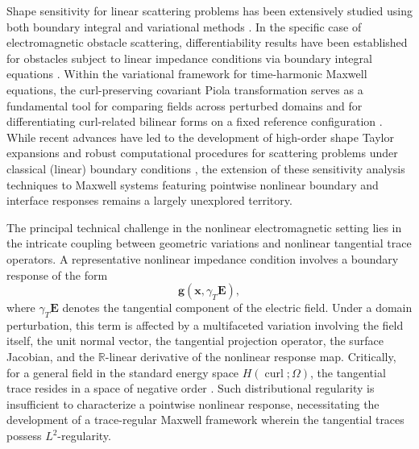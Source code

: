 \documentclass[12pt,reqno]{amsart}
\theoremstyle{definition}
\numberwithin{equation}{section}
\begin{document}
Shape sensitivity for linear scattering problems has been extensively studied using both boundary integral and variational methods \cite{Hettlich1995, Kirsch1989, Kress2018}. In the specific case of electromagnetic obstacle scattering, differentiability results have been established for obstacles subject to linear impedance conditions via boundary integral equations \cite{HaddarKress2004}. Within the variational framework for time-harmonic Maxwell equations, the curl-preserving covariant Piola transformation serves as a fundamental tool for comparing fields across perturbed domains and for differentiating curl-related bilinear forms on a fixed reference configuration \cite{Hettlich2012}. While recent advances have led to the development of high-order shape Taylor expansions and robust computational procedures for scattering problems under classical (linear) boundary conditions \cite{bao2025computation, bao2026shape}, the extension of these sensitivity analysis techniques to Maxwell systems featuring pointwise nonlinear boundary and interface responses remains a largely unexplored territory.

The principal technical challenge in the nonlinear electromagnetic setting lies in the intricate coupling between geometric variations and nonlinear tangential trace operators. A representative nonlinear impedance condition involves a boundary response of the form
\begin{equation*}
    \mathbf{g}(\mathbf{x}, \gamma_T \mathbf{E}),
\end{equation*}
where $\gamma_T \mathbf{E}$ denotes the tangential component of the electric field. Under a domain perturbation, this term is affected by a multifaceted variation involving the field itself, the unit normal vector, the tangential projection operator, the surface Jacobian, and the $\mathbb{R}$-linear derivative of the nonlinear response map. Critically, for a general field in the standard energy space $H(\operatorname{curl}; \Omega)$, the tangential trace resides in a space of negative order \cite{BuffaCostabelSheen2002}. Such distributional regularity is insufficient to characterize a pointwise nonlinear response, necessitating the development of a trace-regular Maxwell framework wherein the tangential traces possess $L^2$-regularity.
\end{document}
